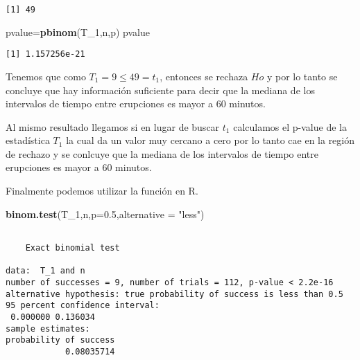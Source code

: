\documentclass[a4paper,oneside,openany]{book}
\newenvironment{Shaded}{\begin{snugshade}}{\end{snugshade}}
\newcommand{\KeywordTok}[1]{\textcolor[rgb]{0.13,0.29,0.53}{\textbf{#1}}}
\newcommand{\DataTypeTok}[1]{\textcolor[rgb]{0.13,0.29,0.53}{#1}}
\newcommand{\DecValTok}[1]{\textcolor[rgb]{0.00,0.00,0.81}{#1}}
\newcommand{\FloatTok}[1]{\textcolor[rgb]{0.00,0.00,0.81}{#1}}
\newcommand{\StringTok}[1]{\textcolor[rgb]{0.31,0.60,0.02}{#1}}
\newcommand{\NormalTok}[1]{#1}
\begin{document}
\begin{verbatim}
[1] 49
\end{verbatim}

\begin{Shaded}
\begin{Highlighting}[]
\NormalTok{pvalue=}\KeywordTok{pbinom}\NormalTok{(T_}\DecValTok{1}\NormalTok{,n,p)}
\NormalTok{pvalue}
\end{Highlighting}
\end{Shaded}

\begin{verbatim}
[1] 1.157256e-21
\end{verbatim}

Tenemos que como \(T_1=9\leq 49 =t_1\), entonces se rechaza \(Ho\) y por
lo tanto se concluye que hay información suficiente para decir que la
mediana de los intervalos de tiempo entre erupciones es mayor a 60
minutos.

Al mismo resultado llegamos si en lugar de buscar \(t_1\) calculamos el
p-value de la estadística \(T_1\) la cual da un valor muy cercano a cero
por lo tanto cae en la región de rechazo y se conlcuye que la mediana de
los intervalos de tiempo entre erupciones es mayor a 60 minutos.

Finalmente podemos utilizar la función en R.

\begin{Shaded}
\begin{Highlighting}[]
\KeywordTok{binom.test}\NormalTok{(T_}\DecValTok{1}\NormalTok{,n,}\DataTypeTok{p=}\FloatTok{0.5}\NormalTok{,}\DataTypeTok{alternative =} \StringTok{"less"}\NormalTok{)}
\end{Highlighting}
\end{Shaded}

\begin{verbatim}

    Exact binomial test

data:  T_1 and n
number of successes = 9, number of trials = 112, p-value < 2.2e-16
alternative hypothesis: true probability of success is less than 0.5
95 percent confidence interval:
 0.000000 0.136034
sample estimates:
probability of success 
            0.08035714 
\end{verbatim}
\end{document}
